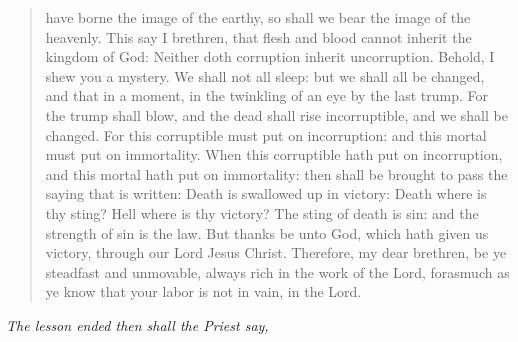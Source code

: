 \documentclass[
]{book}
\begin{document}
\begin{quote}
have borne the image of the earthy, so shall we bear the image of the heavenly. This say I brethren, that flesh and blood cannot inherit the kingdom of God: Neither doth corruption inherit uncorruption. Behold, I shew you a mystery. We shall not all sleep: but we shall all be changed, and that in a moment, in the twinkling of an eye by the last trump. For the trump shall blow, and the dead shall rise incorruptible, and we shall be changed. For this corruptible must put on incorruption: and this mortal must put on immortality. When this corruptible hath put on incorruption, and this mortal hath put on immortality: then shall be brought to pass the saying that is written: Death is swallowed up in victory: Death where is thy sting? Hell where is thy victory? The sting of death is sin: and the strength of sin is the law. But thanks be unto God, which hath given us victory, through our Lord Jesus Christ. Therefore, my dear brethren, be ye steadfast and unmovable, always rich in the work of the Lord, forasmuch as ye know that your labor is not in vain, in the Lord.
\end{quote}

\begin{center}
\emph{The lesson ended then shall the Priest say,}

\end{center}
\end{document}
